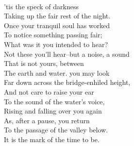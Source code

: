 \documentclass[smalldemyvopaper,11pt,twoside,onecolumn,openright,extrafontsizes]{memoir}
\begin{document}
\\'tis the speck of darkness
\\Taking up the fair rest of the night.
\\Once your tranquil soul has worked
\\To notice something passing fair;
\\What was it you intended to hear?
\\Not these you'll hear--but a noise, a sound
\\That is not yours, between
\\The earth and water. you may look
\\Far down across the bridge-enhiled height,
\\And not care to raise your ear
\\To the sound of the water's voice,
\\Rising and falling over you again
\\As, after a pause, you return
\\To the passage of the valley below.
\\It is the mark of the time to be.
\end{document}

